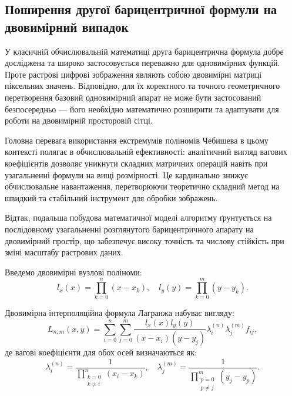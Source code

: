 \subsection{Поширення другої барицентричної формули на двовимірний випадок}

У класичній обчислювальній математиці друга барицентрична формула добре досліджена та широко застосовується переважно для одновимірних функцій. Проте растрові цифрові зображення являють собою двовимірні матриці піксельних значень. Відповідно, для їх коректного та точного геометричного перетворення базовий одновимірний апарат не може бути застосований безпосередньо — його необхідно математично розширити та адаптувати для роботи на двовимірній просторовій сітці.

Головна перевага використання екстремумів поліномів Чебишева в цьому контексті полягає в обчислювальній ефективності: аналітичний вигляд вагових коефіцієнтів дозволяє уникнути складних матричних операцій навіть при узагальненні формули на вищі розмірності. Це кардинально знижує обчислювальне навантаження, перетворюючи теоретично складний метод на швидкий та стабільний інструмент для обробки зображень.

Відтак, подальша побудова математичної моделі алгоритму ґрунтується на послідовному узагальненні розглянутого барицентричного апарату на двовимірний простір, що забезпечує високу точність та числову стійкість при зміні масштабу растрових даних.

Введемо двовимірні вузлові поліноми:
\begin{equation}\label{eq:nodal_polynomials_2d}
	l_x(x) = \prod\limits_{k=0}^{n}(x-x_k), \quad l_y(y) = \prod\limits_{k=0}^{m}(y-y_k).
\end{equation}

Двовимірна інтерполяційна формула Лагранжа набуває вигляду:
\begin{equation}\label{eq:lagrange_2d}
	L_{n,m}(x,y) = \sum\limits_{i=0}^{n} \sum\limits_{j=0}^{m} \frac{l_x(x)l_y(y)}{(x-x_i)(y-y_j)} \lambda_i^{(n)} \lambda_j^{(m)} f_{ij},
\end{equation}
де вагові коефіцієнти для обох осей визначаються як:
\begin{equation}\label{eq:weights_2d}
	\lambda_i^{(n)} = \frac{1}{\prod\limits_{\substack{k=0 \\ k \ne i}}^{n}(x_i-x_k)}, \quad \lambda_j^{(m)} = \frac{1}{\prod\limits_{\substack{p=0 \\ p \ne j}}^{m}(y_j-y_p)}.
\end{equation}

